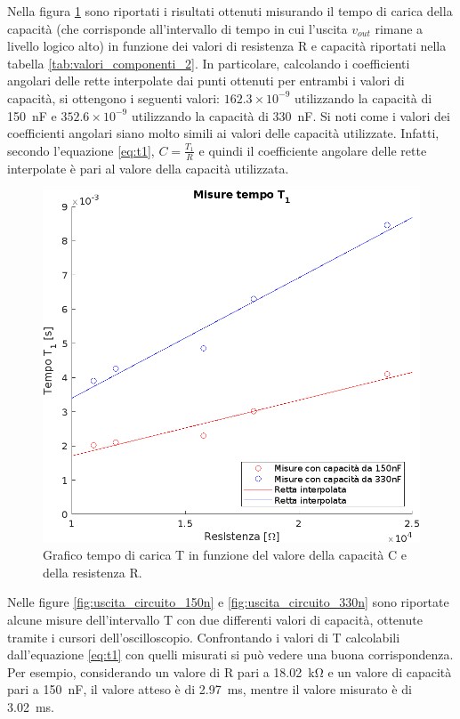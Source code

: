 \noindent
Nella figura \ref{fig:misure_t1} sono riportati i risultati ottenuti misurando il tempo di carica della capacità (che corrisponde all'intervallo di tempo in cui l'uscita $v_{out}$ rimane a livello logico alto) in funzione dei valori di resistenza R e capacità riportati nella tabella \ref{tab:valori_componenti_2}. In particolare, calcolando i coefficienti angolari delle rette interpolate dai punti ottenuti per entrambi i valori di capacità, si ottengono i seguenti valori: $162.3 \times 10^{-9}$ utilizzando la capacità di \SI{150}{\nano\farad} e $352.6 \times 10^{-9}$ utilizzando la capacità di \SI{330}{\nano\farad}. Si noti come i valori dei coefficienti angolari siano molto simili ai valori delle capacità utilizzate. Infatti, secondo l'equazione \ref{eq:t1}, $C=\frac{T_1}{R}$ e quindi il coefficiente angolare delle rette interpolate è pari al valore della capacità utilizzata.
\begin{figure}[h]
	\centering
	\includegraphics[width=0.5\linewidth]{./ImageFiles/Laboratorio 4/Misure tempo t1}
	\caption{Grafico tempo di carica T in funzione del valore della capacità C e della resistenza R.}
	\label{fig:misure_t1}
\end{figure}
Nelle figure \ref{fig:uscita_circuito_150n} e \ref{fig:uscita_circuito_330n} sono riportate alcune misure dell'intervallo T con due differenti valori di capacità, ottenute tramite i cursori dell'oscilloscopio. Confrontando i valori di T calcolabili dall'equazione \ref{eq:t1} con quelli misurati si può vedere una buona corrispondenza. Per esempio, considerando un valore di R pari a \SI{18.02}{\kilo\ohm} e un valore di capacità pari a \SI{150}{\nano\farad}, il valore atteso è di \SI{2.97}{\milli\second}, mentre il valore misurato è di \SI{3.02}{\milli\second}. 

